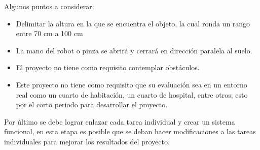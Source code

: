 Algunos puntos a considerar:
    \begin{itemize}
        \item Delimitar la altura en la que se encuentra el objeto, la cual ronda un rango entre 70 cm a 100 cm
        \item La mano del robot o pinza se abrirá y cerrará en dirección paralela al suelo.
        \item El proyecto no tiene como requisito contemplar obstáculos.
        \item Este proyecto no tiene como requisito que su evaluación sea en un entorno real como un cuarto 
        de habitación, un cuarto de hospital, entre otros; esto por el corto periodo para desarrollar el proyecto. 
    \end{itemize}
 
Por último se debe lograr enlazar cada tarea individual y crear un sistema funcional, en esta etapa 
es posible que se deban hacer modificaciones a las tareas individuales para mejorar los resultados del proyecto.  
    

